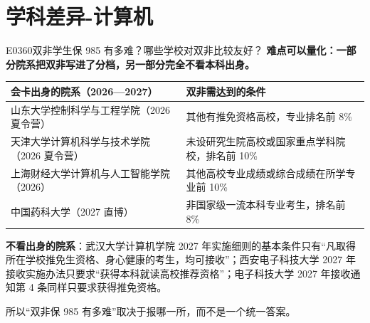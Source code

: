\section{学科差异-计算机}
\begin{qa}{E0360}{双非学生保 985 有多难？哪些学校对双非比较友好？}
\textbf{难点可以量化：一部分院系把双非写进了分档，另一部分完全不看本科出身。}

\par\vspace{2pt}\nobreak\begin{center}\footnotesize
\begin{tabularx}{\textwidth}{>{\raggedright\arraybackslash}X>{\raggedright\arraybackslash}X}
\toprule
\textbf{会卡出身的院系（2026—2027）} & \textbf{双非需达到的条件} \\ \midrule
山东大学控制科学与工程学院（2026 夏令营） & 其他有推免资格高校，专业排名前 8\% \\
天津大学计算机科学与技术学院（2026 夏令营） & 未设研究生院高校或国家重点学科院校，排名前 10\% \\
上海财经大学计算机与人工智能学院（2026） & 其他高校专业成绩或综合成绩在所学专业前 10\% \\
中国药科大学（2027 直博） & 非国家级一流本科专业考生，排名前 8\% \\
\bottomrule
\end{tabularx}
\end{center}\vspace{2pt}\par

\textbf{不看出身的院系}：武汉大学计算机学院 2027 年实施细则的基本条件只有“凡取得所在学校推免生资格、身心健康的考生，均可接收”；西安电子科技大学 2027 年接收实施办法只要求“获得本科就读高校推荐资格”；电子科技大学 2027 年接收通知第 4 条同样只要求获得推免资格。

所以“双非保 985 有多难”取决于报哪一所，而不是一个统一答案。
\end{qa}

